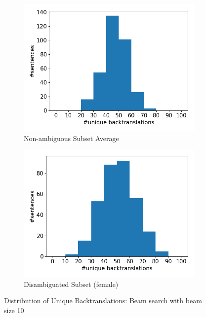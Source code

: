 \begin{figure}[!htb]
\begin{subfigure}{0.49\textwidth}
     \end{subfigure}
     \begin{subfigure}{0.49\textwidth}
         \centering
         \includegraphics[width=\textwidth]{figures/uniqueness/unique_beam10/unique_back_average.png}
         \caption{Non-ambiguous Subset Average}
         \label{fig:uniqueness_common}
     \end{subfigure}
     \hfill
     \begin{subfigure}{0.49\textwidth}
         \centering
         \includegraphics[width=\textwidth]{figures/uniqueness/unique_beam10/unique_back_female.png}
         \caption{Disambiguated Subset (female)}
         \label{fig:uniqueness_female}
     \end{subfigure}
        \caption{Distribution of Unique Backtranslations: Beam search with beam size 10}
        \label{fig:uniqueness_graphs_10}

\end{figure}

